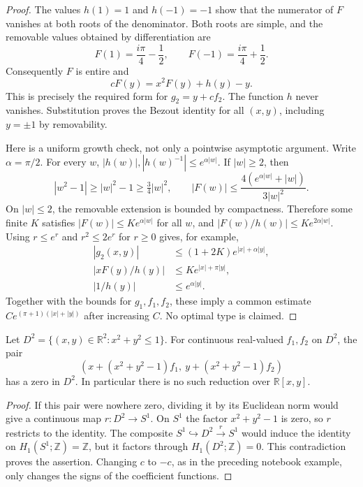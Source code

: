 \begin{proof}
The values \(h(1)=1\) and \(h(-1)=-1\) show that the numerator of \(F\)
vanishes at both roots of the denominator. Both roots are simple, and the
removable values obtained by differentiation are
\[
 F(1)=\frac{i\pi}{4}-\frac12,\qquad
 F(-1)=\frac{i\pi}{4}+\frac12.
\]
Consequently \(F\) is entire and
\[
 cF(y)=x^2F(y)+h(y)-y.
\]
This is precisely the required form for \(g_2=y+cf_2\). The function \(h\)
never vanishes. Substitution proves the Bezout identity for all \((x,y)\),
including \(y=\pm1\) by removability.

Here is a uniform growth check, not only a pointwise asymptotic argument.
Write \(\alpha=\pi/2\). For every \(w\),
\(|h(w)|,|h(w)^{-1}|\le e^{\alpha|w|}\). If \(|w|\ge2\), then
\[
 |w^2-1|\ge |w|^2-1\ge\tfrac34|w|^2,
 \qquad
 |F(w)|\le\frac{4(e^{\alpha|w|}+|w|)}{3|w|^2}.
\]
On \(|w|\le2\), the removable extension is bounded by compactness. Therefore
some finite \(K\) satisfies \(|F(w)|\le K e^{\alpha|w|}\) for all \(w\),
and \(|F(w)/h(w)|\le K e^{2\alpha|w|}\). Using
\(r\le e^r\) and \(r^2\le2e^r\) for \(r\ge0\) gives, for example,
\[
 \begin{split}
 |g_2(x,y)|&\le(1+2K)e^{|x|+\alpha|y|},\\
 |xF(y)/h(y)|&\le K e^{|x|+\pi|y|},\\
 |1/h(y)|&\le e^{\alpha|y|}.
 \end{split}
\]
Together with the bounds for \(g_1,f_1,f_2\), these imply a common estimate
\(C e^{(\pi+1)(|x|+|y|)}\) after increasing \(C\). No optimal type is
claimed.
\end{proof}

\begin{proposition}\ours\quad
Let \(D^2=\{(x,y)\in\mathbb R^2:x^2+y^2\le1\}\). For continuous
real-valued \(f_1,f_2\) on \(D^2\), the pair
\[
 (x+(x^2+y^2-1)f_1,\ y+(x^2+y^2-1)f_2)
\]
has a zero in \(D^2\). In particular there is no such reduction over
\(\mathbb R[x,y]\).
\end{proposition}

\begin{proof}
If this pair were nowhere zero, dividing it by its Euclidean norm would give
a continuous map \(r:D^2\to S^1\). On \(S^1\) the factor
\(x^2+y^2-1\) is zero, so \(r\) restricts to the identity. The composite
\(S^1\hookrightarrow D^2\xrightarrow{r}S^1\) would induce the identity on
\(H_1(S^1;\mathbb Z)=\mathbb Z\), but it factors through
\(H_1(D^2;\mathbb Z)=0\). This contradiction proves the assertion. Changing
\(c\) to \(-c\), as in the preceding notebook example, only changes the
signs of the coefficient functions.
\end{proof}

